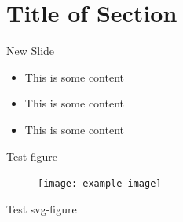 \documentclass[
]{beamer}
\begin{document}
\section{Title of Section}

\begin{frame}{New Slide}

\begin{itemize}
\item This is some content
\item This is some content
\item This is some content
\end{itemize}

\end{frame}

\begin{frame}{Test figure}

\begin{figure}
    \texttt{[image: example-image]}
\end{figure}
\end{frame}

\begin{frame}{Test svg-figure}

\begin{figure}
    \def\svgwidth{.65\textwidth}
    \small{}
\end{figure}

\end{frame}
\end{document}
